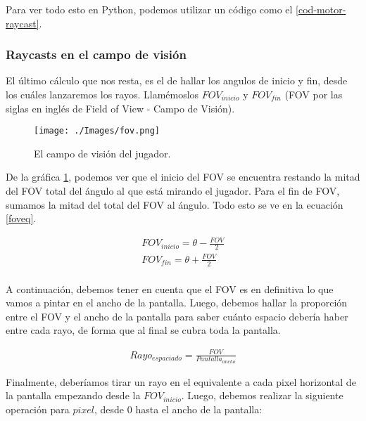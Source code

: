 Para ver todo esto en Python, podemos utilizar un código como el \ref{cod-motor-raycast}.




\subsubsection{Raycasts en el campo de visión}

El último cálculo que nos resta, es el de hallar los angulos de inicio y fin, desde los cuáles lanzaremos los rayos. Llamémoslos $FOV_{inicio}$ y $FOV_{fin}$ (FOV por las siglas en inglés de Field of View - Campo de Visión).

\begin{figure}[h!]
	\centering
	\texttt{[image: ./Images/fov.png]}
	\caption{El campo de visión del jugador.}
	\label{fovgraph}
\end{figure}

De la gráfica \ref{fovgraph}, podemos ver que el inicio del FOV se encuentra restando la mitad del FOV total del ángulo al que está mirando el jugador. Para el fin de FOV, sumamos la mitad del total del FOV al ángulo. Todo esto se ve en la ecuación \ref{foveq}. 

\begin{equation}
\begin{aligned}
\label{foveq}
FOV_{inicio} = \theta - \frac{FOV}{2}\\
FOV_{fin} = \theta + \frac{FOV}{2} \\
\end{aligned}
\end{equation}

A continuación, debemos tener en cuenta que el FOV es en definitiva lo que vamos a pintar en el ancho de la pantalla. Luego, debemos hallar la proporción entre el FOV y el ancho de la pantalla para saber cuánto espacio debería haber entre cada rayo, de forma que al final se cubra toda la pantalla.

\begin{equation}
\begin{aligned}
\label{foveq}
Rayo_{espaciado} = \frac{FOV}{Pantalla_{ancho}}
\end{aligned}
\end{equation}

Finalmente, deberíamos tirar un rayo en el equivalente a cada pixel horizontal de la pantalla empezando desde la $FOV_{inicio}$. Luego, debemos realizar la siguiente operación para $pixel$, desde 0 hasta el ancho de la pantalla:

